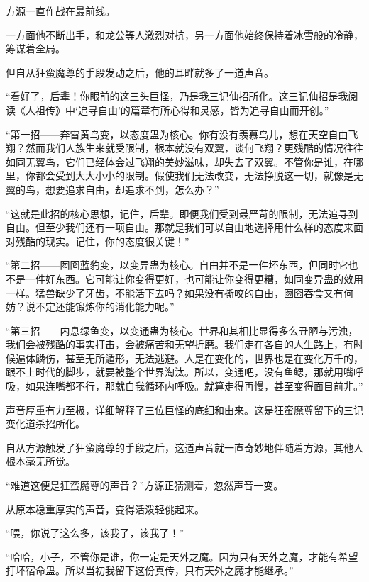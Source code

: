 
\begin{this_body}



方源一直作战在最前线。

一方面他不断出手，和龙公等人激烈对抗，另一方面他始终保持着冰雪般的冷静，筹谋着全局。

但自从狂蛮魔尊的手段发动之后，他的耳畔就多了一道声音。

“看好了，后辈！你眼前的这三头巨怪，乃是我三记仙招所化。这三记仙招是我阅读《人祖传》中‘追寻自由’的篇章有所心得和灵感，皆为追寻自由而开创。”

“第一招——奔雷黄鸟变，以态度蛊为核心。你有没有羡慕鸟儿，想在天空自由飞翔？然而我们人族生来就受限制，根本就没有双翼，谈何飞翔？更残酷的情况往往如同无翼鸟，它们已经体会过飞翔的美妙滋味，却失去了双翼。不管你是谁，在哪里，你都会受到大大小小的限制。假使我们无法改变，无法挣脱这一切，就像是无翼的鸟，想要追求自由，却追求不到，怎么办？”

“这就是此招的核心思想，记住，后辈。即便我们受到最严苛的限制，无法追寻到自由。但至少我们还有一项自由。那就是我们可以自由地选择用什么样的态度来面对残酷的现实。记住，你的态度很关键！”

“第二招——囫囵蓝豹变，以变异蛊为核心。自由并不是一件坏东西，但同时它也不是一件好东西。它可能让你变得更好，也可能让你变得更糟，如同变异蛊的效用一样。猛兽缺少了牙齿，不能活下去吗？如果没有撕咬的自由，囫囵吞食又有何妨？说不定还能锻炼你的消化能力呢。”

“第三招——内息绿鱼变，以变通蛊为核心。世界和其相比显得多么丑陋与污浊，我们会被残酷的事实打击，会被痛苦和无望折磨。我们走在各自的人生路上，有时候遍体鳞伤，甚至无所遁形，无法逃避。人是在变化的，世界也是在变化万千的，跟不上时代的脚步，就要被整个世界淘汰。所以，变通吧，没有鱼鳃，那就用嘴呼吸，如果连嘴都不行，那就自我循环内呼吸。就算走得再慢，甚至变得面目前非。”

声音厚重有力至极，详细解释了三位巨怪的底细和由来。这是狂蛮魔尊留下的三记变化道杀招所化。

自从方源触发了狂蛮魔尊的手段之后，这道声音就一直奇妙地伴随着方源，其他人根本毫无所觉。

“难道这便是狂蛮魔尊的声音？”方源正猜测着，忽然声音一变。

从原本稳重厚实的声音，变得活泼轻佻起来。

“喂，你说了这么多，该我了，该我了！”

“哈哈，小子，不管你是谁，你一定是天外之魔。因为只有天外之魔，才能有希望打坏宿命蛊。所以当初我留下这份真传，只有天外之魔才能继承。”


\end{this_body}
